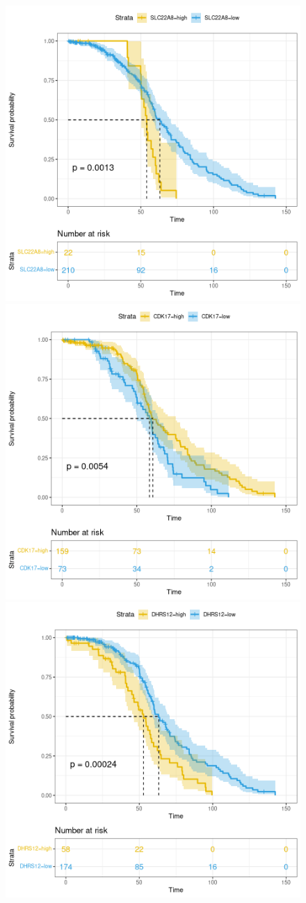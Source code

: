 \documentclass[fleqn,10pt]{SelfArx} %
\begin{document}
\begin{figure}[ht]
\begin{multicols}{2}
			 		\includegraphics[width=0.7\linewidth]{figures/SLC22A8.png}
			 		\includegraphics[width=0.7\linewidth]{figures/CDK17.png}
			 		\includegraphics[width=0.7\linewidth]{figures/DHRS12.png}

\end{multicols}
\end{figure}
\end{document}
